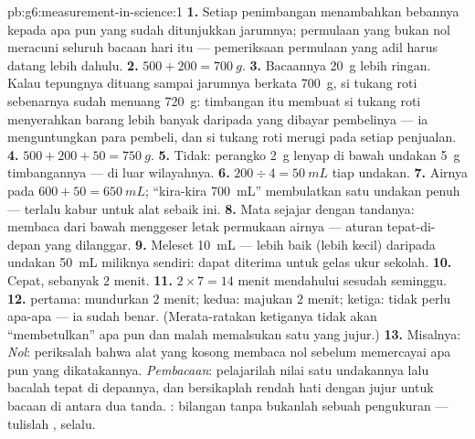 \begin{solution}{pb:g6:measurement-in-science:1}
\textbf{1.} Setiap penimbangan menambahkan bebannya kepada apa pun
yang sudah ditunjukkan jarumnya; permulaan yang bukan nol meracuni
seluruh bacaan hari itu --- pemeriksaan permulaan yang adil harus
datang lebih dahulu.
\textbf{2.} $500 + 200 = \qty{700}{g}$.
\textbf{3.} Bacaannya \qty{20}{g} lebih ringan. Kalau tepungnya
dituang sampai jarumnya berkata \qty{700}{g}, si tukang roti
sebenarnya sudah menuang \qty{720}{g}: timbangan itu membuat si tukang
roti menyerahkan barang lebih banyak daripada yang dibayar pembelinya
--- ia menguntungkan para pembeli, dan si tukang roti merugi pada
setiap penjualan.
\textbf{4.} $500 + 200 + 50 = \qty{750}{g}$.
\textbf{5.} Tidak: perangko \qty{2}{g} lenyap di bawah undakan
\qty{5}{g} timbangannya --- di luar wilayahnya.
\textbf{6.} $200 \div 4 = \qty{50}{mL}$ tiap undakan.
\textbf{7.} Airnya pada $600 + 50 = \qty{650}{mL}$; ``kira-kira
\qty{700}{mL}'' membulatkan satu undakan penuh --- terlalu kabur untuk
alat sebaik ini.
\textbf{8.} Mata sejajar dengan tandanya: membaca dari bawah menggeser
letak permukaan airnya --- aturan tepat-di-depan yang dilanggar.
\textbf{9.} Meleset \qty{10}{mL} --- lebih baik (lebih kecil) daripada
undakan \qty{50}{mL} miliknya sendiri: dapat diterima untuk gelas ukur
sekolah.
\textbf{10.} Cepat, sebanyak $2$ menit.
\textbf{11.} $2 \times 7 = 14$ menit mendahului sesudah seminggu.
\textbf{12.}  pertama: mundurkan $2$ menit;  kedua: majukan $2$
menit;  ketiga: tidak perlu apa-apa --- ia sudah benar.
(Merata-ratakan ketiganya tidak akan ``membetulkan'' apa pun dan malah
memalsukan satu  yang jujur.)
\textbf{13.} Misalnya: \emph{Nol}: periksalah bahwa alat yang kosong
membaca nol sebelum memercayai apa pun yang dikatakannya.
\emph{Pembacaan}: pelajarilah nilai satu undakannya lalu bacalah tepat
di depannya, dan bersikaplah rendah hati dengan jujur untuk bacaan di
antara dua tanda. \emph{}: bilangan tanpa  bukanlah
sebuah pengukuran --- tulislah , selalu.
\end{solution}
